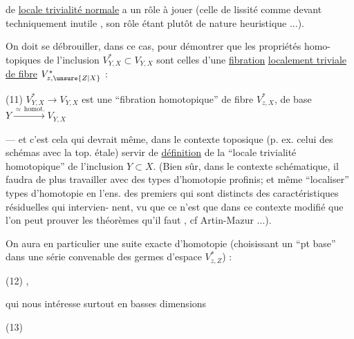 de \uline{locale trivialité normale} a un rôle
à jouer (celle de lissité  comme
devant techniquement inutile , son rôle
étant plutôt de nature heuristique ...).

 On doit se débrouiller, dans ce cas,
pour démontrer que les propriétés homo-
topiques de l'inclusion $V^*_{Y,X}\subset V_{Y,X}$
sont celles d'une \uline{fibration}
\uline{localement triviale de fibre} $V^*_{z,\unsure{Z|X}}$ :

\noindent (11) $V^*_{Y,X}\longrightarrow V_{Y,X}$ est une ``fibration
homotopique'' de fibre $V^*_{z,X}$,
de base $Y\xrightarrow{\approx\,\mathrm{homot.}} V_{Y,X}$

--- et c'est cela qui devrait même,
dans le contexte toposique (p. ex. celui
des schémas avec la top. étale) servir
de \uline{définition} de la ``locale trivialité 
homotopique'' de l'inclusion $Y\subset X$.
(Bien sûr, dans le contexte schématique,
il faudra de plus travailler avec
des types d'homotopie profinis; et
même  ``localiser''  types d'homotopie
en l'ens. des  premiers qui sont distincts
des caractéristiques résiduelles qui intervien-
nent, vu que ce n'est que dans ce
contexte modifié que l'on peut prouver
les théorèmes qu'il faut ,
cf Artin-Mazur ...).

On aura en particulier une suite
exacte d'homotopie  (choisissant
un  ``pt base'' dans une série
convenable  des germes d'espace $V^*_{z,Z}$) :

\noindent (12)
,

qui nous intéresse surtout en basses
dimensions

\noindent (13)

